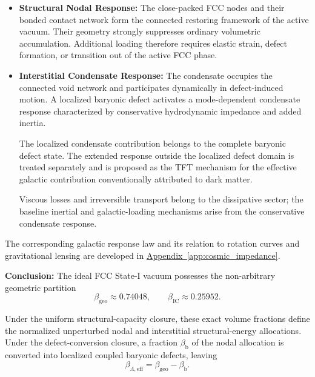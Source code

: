 \begin{itemize}
    \item \textbf{Structural Nodal Response:}
    The close-packed FCC nodes and their bonded contact network form the connected restoring framework of the active vacuum. Their geometry strongly suppresses ordinary volumetric accumulation. Additional loading therefore requires elastic strain, defect formation, or transition out of the active FCC phase.

    \item \textbf{Interstitial Condensate Response:}
    The condensate occupies the connected void network and participates dynamically in defect-induced motion. A localized baryonic defect activates a mode-dependent condensate response characterized by conservative hydrodynamic impedance and added inertia.

    The localized condensate contribution belongs to the complete baryonic defect state. The extended response outside the localized defect domain is treated separately and is proposed as the TFT mechanism for the effective galactic contribution conventionally attributed to dark matter.

    Viscous losses and irreversible transport belong to the dissipative sector; the baseline inertial and galactic-loading mechanisms arise from the conservative condensate response.
\end{itemize}

The corresponding galactic response law and its relation to rotation curves and gravitational lensing are developed in \hyperref[app:cosmic_impedance]{Appendix~\ref*{app:cosmic_impedance}}.

\vspace{1em}
\noindent\textbf{Conclusion:}
The ideal FCC State-I vacuum possesses the non-arbitrary geometric partition
\begin{equation}
    \beta_{\mathrm{geo}} \approx 0.74048, \qquad \beta_{\mathrm{IC}} \approx 0.25952.
\end{equation}

Under the uniform structural-capacity closure, these exact volume fractions define the normalized unperturbed nodal and interstitial structural-energy allocations. Under the defect-conversion closure, a fraction $\beta_{\mathrm{b}}$ of the nodal allocation is converted into localized coupled baryonic defects, leaving
\begin{equation}
    \beta_{\Lambda,\mathrm{eff}} = \beta_{\mathrm{geo}} - \beta_{\mathrm{b}}.
\end{equation}

